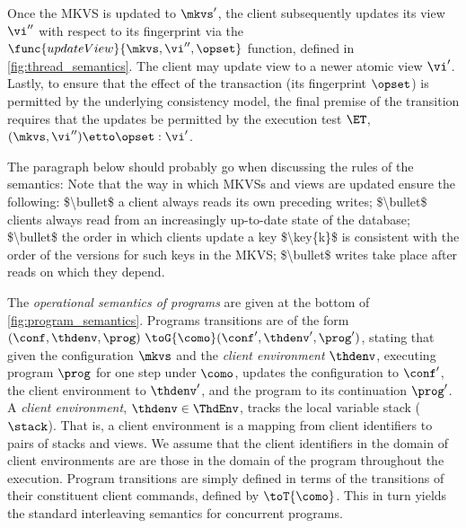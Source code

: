Once the MKVS is updated to $\mkvs'$, the client subsequently updates its view $\vi''$ with respect to its fingerprint via the $\func{updateView}{\mkvs, \vi'', \opset}$ function, defined in \cref{fig:thread_semantics}.
The client may update view to a newer atomic view $\vi'$.
Lastly, to ensure that the effect of the transaction (its fingerprint  $\opset$) is permitted by the underlying consistency model, 
the final premise of the transition requires that the updates be permitted by the execution test $\ET$, \ie \( (\mkvs, \vi'') \etto \opset : \vi'\).



\ac{The paragraph below should probably go when discussing the rules of the semantics:

Note that the way in which MKVSs and views are updated ensure the following: 
$\bullet$ a client always reads its own preceding writes; 
$\bullet$ clients always read from an increasingly up-to-date state of the database; 
$\bullet$ the order in which clients update a key $\key{k}$ is consistent with the 
order of the versions for such keys in the MKVS; 
$\bullet$ writes take place after reads on which they depend. 
}



The \emph{operational semantics of programs} are given at the bottom of \cref{fig:program_semantics}. 
Programs transitions are of the form $(\conf,  \thdenv, \prog) \ \toG{\como} (\conf',  \thdenv', \prog')$,
stating that given the configuration $\mkvs$ and the \emph{client environment} $\thdenv$, executing program $\prog$ for one step under $\como$, updates the configuration to $\conf'$, the client environment to $\thdenv'$, and the program to its continuation $\prog'$. 
A \emph{client environment}, $\thdenv \in \ThdEnv$, tracks the local variable stack ($\stack$). 
That is, a client environment is a mapping from client identifiers to pairs of stacks and views. 
We assume that the client identifiers in the domain of client environments are are those in the domain of the program throughout the execution. 
Program transitions are simply defined in terms of the transitions of their constituent client commands, defined by $\toT{\como}$. 
This in turn yields the standard interleaving semantics for concurrent programs. 

